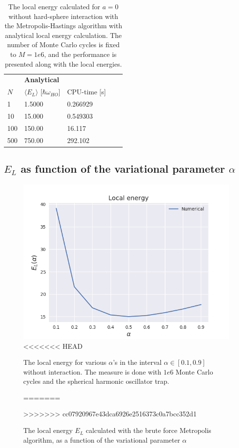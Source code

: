 \documentclass[norsk,a4paper,12pt]{article}
\begin{document}
\begin{table} [H]
	\centering
	\caption{The local energy calculated for $a=0$  without hard-sphere interaction with the Metropolis-Hastings algorithm with analytical local energy calculation. The number of Monte Carlo cycles is fixed to $M=1e6$, and the performance is presented along with the local energies.}
	\begin{tabularx}{\textwidth}{X|XX|XX} \hline
		\label{tab:ISmet}
		& \textbf{Analytical} \\
		$N$ & $\langle E_L\rangle$ [$\hbar\omega_{HO}$] & CPU-time [s] \\ \hline
		1 & 1.5000 & 0.266929  \\
		10 & 15.000 &  0.549303  \\
		100 & 150.00 & 16.117 \\
		500 & 750.00 & 292.102 \\ \hline
	\end{tabularx}
\end{table}


\subsection{$E_L$ as function of the variational parameter $\alpha$}

\begin{figure} [H]
    \centering
    \includegraphics[scale=0.65]{images/energy.png}
<<<<<<< HEAD
    \caption{The local energy for various $\alpha$'s in the interval $\alpha\in[0.1,0.9]$ without interaction. The measure is done with $1e6$ Monte Carlo cycles and the spherical harmonic oscillator trap. }
    \label{fig:energy}
=======
    \caption{The local energy $E_L$ calculated with the brute force Metropolis algorithm, as a function of the variational parameter $\alpha$}
    \label{fig:EL_as_func_of_alpha}
>>>>>>> cc07920967e43dca6926e2516373c0a7bcc352d1
\end{figure} 
\end{document}
